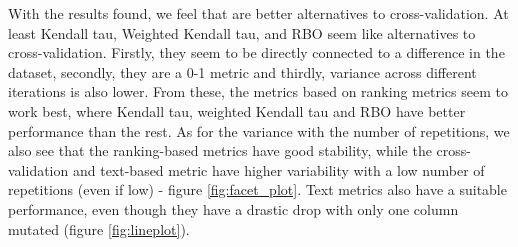 With the results found, we feel that are better alternatives to cross-validation. At least  Kendall tau, Weighted Kendall tau, and RBO seem like alternatives to cross-validation.
Firstly, they seem to be directly connected to a difference in the dataset, secondly, they are a 0-1 metric and thirdly, variance across different iterations is also lower.
From these, the metrics based on ranking metrics seem to work best, where Kendall tau, weighted Kendall tau and RBO have better performance than the rest. As for the variance with the number of repetitions, we also see that the ranking-based metrics have good stability, while the cross-validation and text-based metric have higher variability with a low number of repetitions (even if low) - figure \ref{fig:facet_plot}. 
Text metrics also have a suitable performance, even though they have a drastic drop with only one column mutated (figure \ref{fig:lineplot}).

